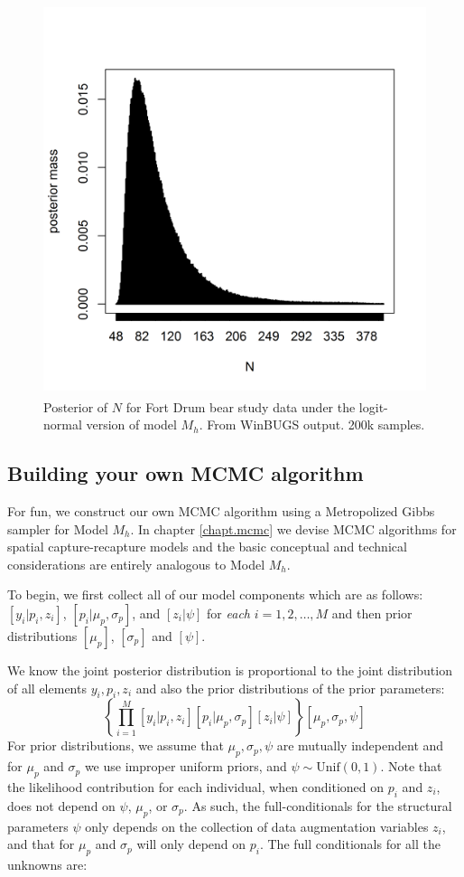\begin{figure}
\centering
\includegraphics[height=4.5in,width=4.5in]{figs/bear-modelMh-post}
\caption{Posterior of $N$ for Fort Drum bear study data under the
logit-normal version of model $M_h$. From WinBUGS output. 200k
samples. 
}
\label{closed.fig.bearMh}
\end{figure}


\subsection{Building your own MCMC algorithm}

For fun, we construct our own MCMC algorithm using a Metropolized
Gibbs sampler for Model $M_{h}$.  In chapter \ref{chapt.mcmc} we devise MCMC
algorithms for spatial capture-recapture models and the basic
conceptual and technical considerations are entirely analogous to
Model $M_h$.

To begin, we first collect all of our model components
which are as follows: $[y_{i}| p_{i},z_{i}]$,
$[p_{i}|\mu_{p},\sigma_{p}]$, and $[z_{i}|\psi]$
for {\it each} $i=1,2,\ldots,M$ and then prior distributions
$[\mu_{p}]$, $[\sigma_{p}]$ and $[\psi]$. 

We know  the joint posterior distribution 
is proportional to the joint distribution of all elements
$y_{i},p_{i},z_{i}$ and also the prior distributions of the prior parameters:
\[
\left\{ \prod_{i=1}^{M} [y_{i}|p_{i},z_{i}][p_{i}|\mu_{p},\sigma_{p}]
[z_{i}|\psi] \right\} [\mu_{p},\sigma_{p},\psi]
\]
For prior distributions, we assume that $\mu_{p},\sigma_{p}, \psi$ are
mutually independent and for $\mu_{p}$ and $\sigma_{p}$ we use
improper uniform priors, and $\psi \sim \mbox{Unif}(0,1)$.  Note that
the likelihood contribution for each individual, when conditioned on
$p_{i}$ and $z_{i}$, does not depend on $\psi$, $\mu_{p}$, or
$\sigma_{p}$.  As such, the full-conditionals for the structural
parameters $\psi$ only depends on the collection of data augmentation
variables $z_{i}$, and that for $\mu_{p}$ and $\sigma_{p}$ will only
depend on $p_{i}$.  The full conditionals for all the unknowns are:

